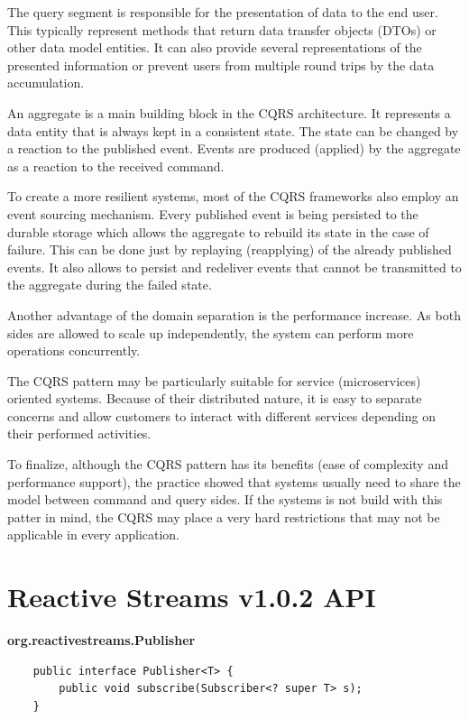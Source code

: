 \documentclass[oneside,
  digital, %
  table,   %
  lof,     %
  lot,     %
]{fithesis3}
\begin{document}
The query segment is responsible for the presentation of data to the end user. This typically represent methods that return data transfer objects (DTOs) or other data model entities. It can also provide several representations of the presented information or prevent users from multiple round trips by the data accumulation.

An aggregate is a main building block in the CQRS architecture. It represents a data entity that is always kept in a consistent state. The state can be changed by a reaction to the published event. Events are produced (applied) by the aggregate as a reaction to the received command. 

To create a more resilient systems, most of the CQRS frameworks also employ an event sourcing mechanism. Every published event is being persisted to the durable storage which allows the aggregate to rebuild its state in the case of failure. This can be done just by replaying (reapplying) of the already published events. It also allows to persist and redeliver events that cannot be transmitted to the aggregate during the failed state.

Another advantage of the domain separation is the performance increase. As both sides are allowed to scale up independently, the system can perform more operations concurrently.

The CQRS pattern may be particularly suitable for service (microservices) oriented systems. Because of their distributed nature, it is easy to separate concerns and allow customers to interact with different services depending on their performed activities.

To finalize, although the CQRS pattern has its benefits (ease of complexity and performance support), the practice showed that systems usually need to share the model between command and query sides. If the systems is not build with this patter in mind, the CQRS may place a very hard restrictions that may not be applicable in every application.


\clearpage
\chapter{Reactive Streams v1.0.2 API}
\label{reactive_streams}

\noindent
\textbf{org.reactivestreams.Publisher}

\begin{verbatim}
    public interface Publisher<T> {
        public void subscribe(Subscriber<? super T> s);
    }
\end{verbatim}
\end{document}
